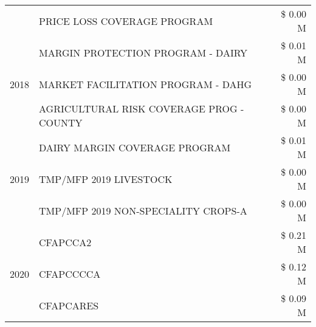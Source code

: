 \begin{tabular}{llr}
 & PRICE LOSS COVERAGE PROGRAM & \$ 0.00 M \\
\cline{1-3}
\multirow[t]{3}{*}{2018} & MARGIN PROTECTION PROGRAM - DAIRY & \$ 0.01 M \\
 & MARKET FACILITATION PROGRAM - DAHG & \$ 0.00 M \\
 & AGRICULTURAL RISK COVERAGE PROG - COUNTY & \$ 0.00 M \\
\cline{1-3}
\multirow[t]{3}{*}{2019} & DAIRY MARGIN COVERAGE PROGRAM & \$ 0.01 M \\
 & TMP/MFP 2019 LIVESTOCK & \$ 0.00 M \\
 & TMP/MFP 2019 NON-SPECIALITY CROPS-A & \$ 0.00 M \\
\cline{1-3}
\multirow[t]{3}{*}{2020} & CFAPCCA2 & \$ 0.21 M \\
 & CFAPCCCCA & \$ 0.12 M \\
 & CFAPCARES & \$ 0.09 M \\
\cline{1-3}
\bottomrule
\end{tabular}
